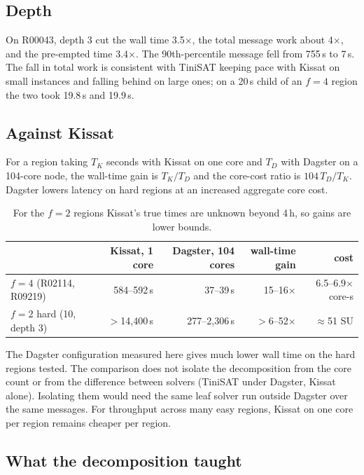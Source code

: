 \documentclass[11pt,a4paper]{article}
\theoremstyle{definition}
\begin{document}
\subsection{Depth}
On R00043, depth 3 cut the wall time 3.5$\times$, the total message work about 4$\times$, and
the pre-empted time 3.4$\times$. The 90th-percentile message fell from 755\,s to 7\,s. The fall
in total work is consistent with TiniSAT keeping pace with Kissat on small instances and falling
behind on large ones; on a 20\,s child of an $f=4$ region the two took 19.8\,s and 19.9\,s.

\subsection{Against Kissat}
For a region taking $T_K$ seconds with Kissat on one core and $T_D$ with Dagster on a
104-core node, the wall-time gain is $T_K/T_D$ and the core-cost ratio is $104\,T_D/T_K$.
Dagster lowers latency on hard regions at an increased aggregate core cost.

\begin{table}[H]
\centering
\begin{tabular}{@{}lrrrr@{}}
\toprule
& Kissat, 1 core & Dagster, 104 cores & wall-time gain & cost \\
\midrule
$f=4$ (R02114, R09219) & 584--592\,s & 37--39\,s & 15--16$\times$ & 6.5--6.9$\times$ core-s \\
$f=2$ hard (10, depth 3) & $>$14{,}400\,s & 277--2{,}306\,s & $>$6--52$\times$ & $\approx$51 SU \\
\bottomrule
\end{tabular}
\caption{For the $f=2$ regions Kissat's true times are unknown beyond 4\,h, so gains are lower bounds.}
\label{tab:vs}
\end{table}

The Dagster configuration measured here gives much lower wall time on the hard regions tested.
The comparison does not isolate the decomposition from the core count or from the
difference between solvers (TiniSAT under Dagster, Kissat alone). Isolating them would need
the same leaf solver run outside Dagster over the same messages. For throughput across many
easy regions, Kissat on one core per region remains cheaper per region.



\subsection{What the decomposition taught}\label{sec:lessons}
\end{document}

